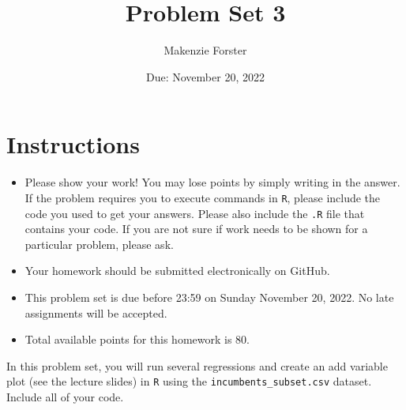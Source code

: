 \documentclass[12pt,letterpaper]{article}
\title{Problem Set 3}
\date{Due: November 20, 2022}
\author{Makenzie Forster}
\begin{document}
	\maketitle
	\section*{Instructions}
	\begin{itemize}
		\item Please show your work! You may lose points by simply writing in the answer. If the problem requires you to execute commands in \texttt{R}, please include the code you used to get your answers. Please also include the \texttt{.R} file that contains your code. If you are not sure if work needs to be shown for a particular problem, please ask.
	\item Your homework should be submitted electronically on GitHub.
	\item This problem set is due before 23:59 on Sunday November 20, 2022. No late assignments will be accepted.
	\item Total available points for this homework is 80.
	\end{itemize}

		\vspace{.25cm}
	
\noindent In this problem set, you will run several regressions and create an add variable plot (see the lecture slides) in \texttt{R} using the \texttt{incumbents\_subset.csv} dataset. Include all of your code.

	\vspace{.5cm}
\end{document}
